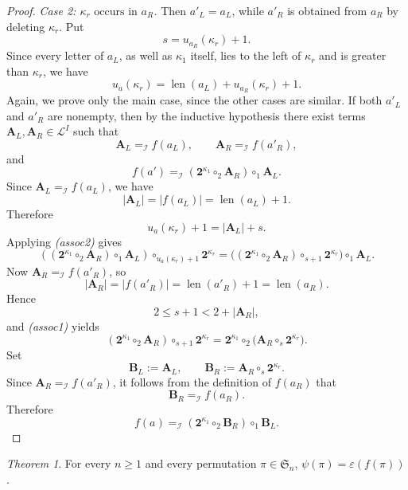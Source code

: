 \documentclass[a4paper]{article}
\theoremstyle{plain}
\theoremstyle{definition}
\theoremstyle{remark}
\numberwithin{equation}{section}
\renewcommand{\le}{\leqslant}\renewcommand{\ge}{\geqslant}
\newcommand{\Sym}{\mathfrak{S}}
\newcommand{\eval}{\varepsilon}
\newtheorem{theorem}{Theorem}[section]
\begin{document}
\begin{proof}
\medskip
\noindent\emph{Case 2: \(\kappa_r\text{ occurs in } a_R\).} Then \(a'_L=a_L\), while \(a'_R\) is obtained from \(a_R\) by deleting
\(\kappa_r\). Put
\[
s=u_{a_R}(\kappa_r)+1.
\]
Since every letter of \(a_L\), as well as \(\kappa_1\) itself, lies to the left
of \(\kappa_r\) and is greater than \(\kappa_r\), we have
\[
u_a(\kappa_r)=\operatorname{len}(a_L)+u_{a_R}(\kappa_r)+1.
\]
Again, we prove only the main case, since the other cases are similar.
\smallskip
\noindent If both \(a'_L\) and \(a'_R\) are nonempty, then by the inductive
hypothesis there exist terms \(\mathbf A_L,\mathbf A_R\in\mathcal L^I\) such that
\[
\mathbf A_L =_{\mathcal I} f(a_L),\qquad \mathbf A_R =_{\mathcal I} f(a'_R),
\]
and
\[
f(a') =_{\mathcal I} (\mathbf 2^{\kappa_1}\circ_2 \mathbf A_R)\circ_1 \mathbf A_L.
\]
Since \(\mathbf A_L =_{\mathcal I} f(a_L)\), we have
\[
|\mathbf A_L|=|f(a_L)|=\operatorname{len}(a_L)+1.
\]
Therefore
\[
u_a(\kappa_r)+1=|\mathbf A_L|+s.
\]
Applying \emph{(assoc2)} gives
\[
((\mathbf 2^{\kappa_1}\circ_2 \mathbf A_R)\circ_1 \mathbf A_L)\circ_{u_a(\kappa_r)+1}\mathbf 2^{\kappa_r}
=
\bigl((\mathbf 2^{\kappa_1}\circ_2 \mathbf A_R)\circ_{s+1}\mathbf 2^{\kappa_r}\bigr)\circ_1 \mathbf A_L.
\]
Now \(\mathbf A_R =_{\mathcal I} f(a'_R)\), so
\[
|\mathbf A_R|=|f(a'_R)|=\operatorname{len}(a'_R)+1=\operatorname{len}(a_R).
\]
Hence
\[
2\le s+1<2+|\mathbf A_R|,
\]
and \emph{(assoc1)} yields
\[
(\mathbf 2^{\kappa_1}\circ_2 \mathbf A_R)\circ_{s+1}\mathbf 2^{\kappa_r}
=
\mathbf 2^{\kappa_1}\circ_2\bigl(\mathbf A_R\circ_s \mathbf 2^{\kappa_r}\bigr).
\]
Set
\[
\mathbf B_L:=\mathbf A_L,
\qquad
\mathbf B_R:=\mathbf A_R\circ_s \mathbf 2^{\kappa_r}.
\]
Since \(\mathbf A_R =_{\mathcal I} f(a'_R)\), it follows from the definition of \(f(a_R)\) that
\[
\mathbf B_R =_{\mathcal I} f(a_R).
\]
Therefore
\[
f(a)=_{\mathcal I}(\mathbf 2^{\kappa_1}\circ_2 \mathbf B_R)\circ_1 \mathbf B_L.
\]
\end{proof}

\begin{theorem}\label{thm:psi-via-f}
For every \(n\ge 1\) and every permutation \(\pi\in\Sym_n\), $\psi(\pi)=\eval(f(\pi))$.
\end{theorem}
\end{document}
